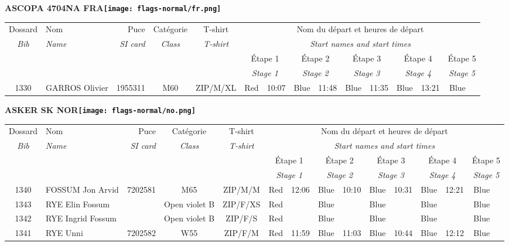 \documentclass{report}
\begin{document}
\newpage
  \Huge \centering \bfseries ASCOPA 4704NA FRA\normalfont \footnotesize \sffamily \hfill \texttt{[image: flags-normal/fr.png]} \newline 
  \begin{longtable}{|c|l|r|c|c|*{5}{cc|}}
    Dossard & Nom  & Puce    & Catégorie & T-shirt & \multicolumn{10}{c|}{Nom du départ et heures de départ} \\
    \itshape Bib     & \itshape Name & \itshape SI card & \itshape Class  & \itshape  T-shirt  & \multicolumn{10}{c|}{\itshape Start names and start times} \\
    \hline
    & & & & & \multicolumn{2}{c|}{Étape 1} & \multicolumn{2}{c|}{Étape 2} & \multicolumn{2}{c|}{Étape 3} & \multicolumn{2}{c|}{Étape 4} & \multicolumn{2}{c|}{Étape 5} \\
    & & & & & \multicolumn{2}{c|}{\itshape Stage 1} & \multicolumn{2}{c|}{\itshape Stage 2} & \multicolumn{2}{c|}{\itshape Stage 3} & \multicolumn{2}{c|}{\itshape Stage 4} & \multicolumn{2}{c|}{\itshape Stage 5} \\
    \hline
    1330 & GARROS Olivier & 1955311 & M60 & ZIP/M/XL & Red & 10:07 & Blue & 11:48 & Blue & 11:35 & Blue & 13:21 & Blue &  \\
  \end{longtable}
\newpage
  \Huge \centering \bfseries ASKER SK  NOR\normalfont \footnotesize \sffamily \hfill \texttt{[image: flags-normal/no.png]} \newline 
  \begin{longtable}{|c|l|r|c|c|*{5}{cc|}}
    Dossard & Nom  & Puce    & Catégorie & T-shirt & \multicolumn{10}{c|}{Nom du départ et heures de départ} \\
    \itshape Bib     & \itshape Name & \itshape SI card & \itshape Class  & \itshape  T-shirt  & \multicolumn{10}{c|}{\itshape Start names and start times} \\
    \hline
    & & & & & \multicolumn{2}{c|}{Étape 1} & \multicolumn{2}{c|}{Étape 2} & \multicolumn{2}{c|}{Étape 3} & \multicolumn{2}{c|}{Étape 4} & \multicolumn{2}{c|}{Étape 5} \\
    & & & & & \multicolumn{2}{c|}{\itshape Stage 1} & \multicolumn{2}{c|}{\itshape Stage 2} & \multicolumn{2}{c|}{\itshape Stage 3} & \multicolumn{2}{c|}{\itshape Stage 4} & \multicolumn{2}{c|}{\itshape Stage 5} \\
    \hline
    1340 & FOSSUM Jon Arvid & 7202581 & M65 & ZIP/M/M & Red & 12:06 & Blue & 10:10 & Blue & 10:31 & Blue & 12:21 & Blue &  \\
    1343 & RYE Elin Fossum &  & Open violet B & ZIP/F/XS & Red &   & Blue &   & Blue &   & Blue &   & Blue &  \\
    1342 & RYE Ingrid Fossum &  & Open violet B & ZIP/F/S & Red &   & Blue &   & Blue &   & Blue &   & Blue &  \\
    1341 & RYE Unni & 7202582 & W55 & ZIP/F/M & Red & 11:59 & Blue & 11:03 & Blue & 10:44 & Blue & 12:12 & Blue &  \\
  \end{longtable}
\end{document}
